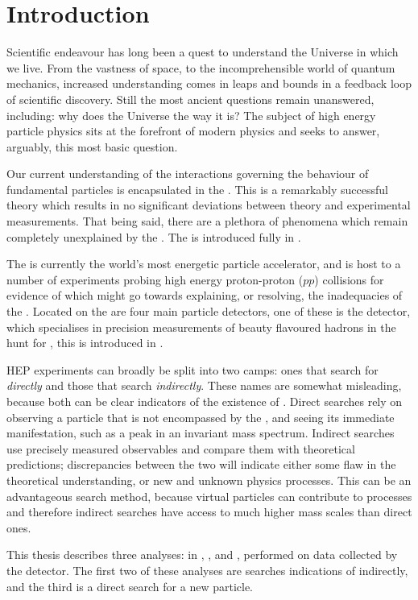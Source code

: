 \chapter{Introduction}
\label{ch:intro}

Scientific endeavour has long been a quest to understand the Universe in which we live.
From the vastness of space, to the incomprehensible world of quantum mechanics,
increased understanding comes in leaps and bounds in a feedback loop of scientific discovery.
Still the most ancient questions remain unanswered, including: why does the Universe the way it is?
The subject of high energy particle physics sits at the forefront of modern physics and seeks to
answer, arguably, this most basic question.

Our current understanding of the interactions governing the behaviour of fundamental particles is
encapsulated in the \sm.
This is a remarkably successful theory which results in no significant deviations between theory
and experimental measurements.
That being said, there are a plethora of phenomena which remain completely unexplained by the \sm.
The \sm is introduced fully in .

The \lhc is currently the world's most energetic particle accelerator, and is host to a number of
experiments probing high energy proton-proton ($pp$) collisions for evidence of \np
which might go towards explaining, or resolving, the inadequacies of the \sm.
Located on the \lhc are four main particle detectors, one of these is the \lhcb detector, which
specialises in precision measurements of beauty flavoured hadrons in the hunt for \np, this is
introduced in .

\gls{HEP} experiments can broadly be split into two camps: ones that search for \np
\emph{directly} and those that search \emph{indirectly}.
These names are somewhat misleading, because both can be clear indicators of the existence of
\np.
Direct searches rely on observing a particle that is not encompassed by the \sm,
and seeing its immediate manifestation, such as a peak in an invariant mass spectrum.
Indirect searches
use precisely measured observables and compare them with theoretical predictions; discrepancies
between the two will indicate either some flaw in the theoretical understanding, or new and unknown
physics processes.
This can be an advantageous search method, because virtual particles can contribute to processes
and therefore indirect searches have access to much higher mass scales than direct ones.

This thesis describes three analyses: in , , and ,
performed on data collected by the \lhcb detector.
The first two of these analyses are searches indications of \np indirectly, and the third is a
direct search for a new particle.


\clearpage
